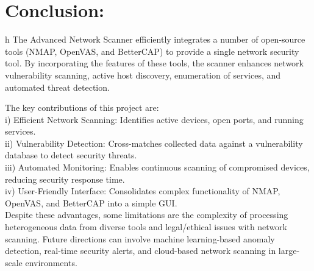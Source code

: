 \documentclass[conference]{IEEEtran}
\begin{document}
\section{Conclusion:}{h}
The Advanced Network Scanner efficiently integrates a number of open-source tools (NMAP, OpenVAS, and BetterCAP) to provide a single network security tool. By incorporating the features of these tools, the scanner enhances network vulnerability scanning, active host discovery, enumeration of services, and automated threat detection.

The key contributions of this project are:\\

i) Efficient Network Scanning: Identifies active devices, open ports, and running services.\\
ii) Vulnerability Detection: Cross-matches collected data against a vulnerability database to detect security threats.\\
iii) Automated Monitoring: Enables continuous scanning of compromised devices, reducing security response time.\\
iv) User-Friendly Interface: Consolidates complex functionality of NMAP, OpenVAS, and BetterCAP into a simple GUI.\\
Despite these advantages, some limitations are the complexity of processing heterogeneous data from diverse tools and legal/ethical issues with network scanning. Future directions can involve machine learning-based anomaly detection, real-time security alerts, and cloud-based network scanning in large-scale environments.
\end{document}
